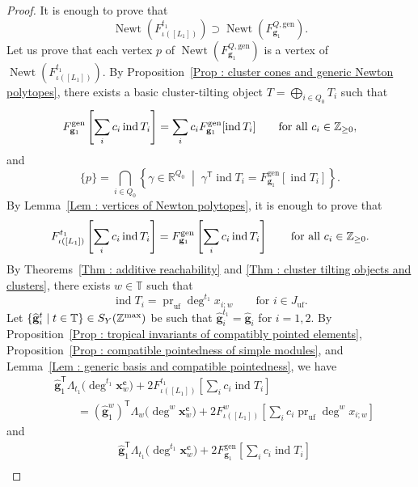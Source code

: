 \begin{proof}
It is enough to prove that
\[
\operatorname{Newt}(F^{t_1}_{\iota([L_1])})
\supset \operatorname{Newt}(F^{Q,\mathrm{gen}}_{\mathbf{g}_1}).
\]
Let us prove that each vertex $p$ of
$\operatorname{Newt}(F^{Q,\mathrm{gen}}_{\mathbf{g}_1})$
is a vertex of $\operatorname{Newt}(F^{t_1}_{\iota([L_1])})$.
By Proposition~\ref{Prop : cluster cones and generic Newton polytopes},
there exists a basic cluster-tilting object
$T = \bigoplus_{i \in Q_0}T_i$ such that
\[
F^{\mathrm{gen}}_{\mathbf{g}_1}
\left[\sum_i c_i\operatorname{ind}T_i\right]
= \sum_i c_i F^{\mathrm{gen}}_{\mathbf{g}_1}
[\operatorname{ind}T_i]
\qquad\text{for all }c_i \in \mathbb{Z}_{\geq 0},
\]
and
\[
\{p\} = \bigcap_{i \in Q_0}
\left\{\gamma \in \mathbb{R}^{Q_0}
\;\middle|\;
\gamma^{\mathsf{T}}\operatorname{ind}T_i
= F^{\mathrm{gen}}_{\mathbf{g}_1}[\operatorname{ind}T_i]
\right\}.
\]
By Lemma~\ref{Lem : vertices of Newton polytopes},
it is enough to prove that
\[
F^{t_1}_{\iota([L_1])}
\left[\sum_i c_i\operatorname{ind}T_i\right]
= F^{\mathrm{gen}}_{\mathbf{g}_1}
\left[\sum_i c_i\operatorname{ind}T_i\right]
\qquad\text{for all }c_i \in \mathbb{Z}_{\geq 0}.
\]
By Theorems~\ref{Thm : additive reachability} and
\ref{Thm : cluster tilting objects and clusters},
there exists $w \in \mathbb{T}$ such that
\[
\operatorname{ind}T_i
= \operatorname{pr}_{\mathrm{uf}}\deg^{t_1}x_{i;w}
\qquad\text{for }i \in J_{\mathrm{uf}}.
\]
Let
$\{\widehat{\mathbf{g}}_i^t \mid t \in \mathbb{T}\}
\in S_Y(\mathbb{Z}^{\max})$
be such that
$\widehat{\mathbf{g}}_i^{t_1} = \widehat{\mathbf{g}}_i$
for $i = 1, 2$.
By Proposition~\ref{Prop : tropical invariants of compatibly pointed elements},
Proposition~\ref{Prop : compatible pointedness of simple modules}, and
Lemma~\ref{Lem : generic basis and compatible pointedness}, we have
\[
\begin{aligned}
&\widehat{\mathbf{g}}_1^{\mathsf{T}}\Lambda_{t_1}
\bigl(\deg^{t_1}\mathbf{x}_{w}^{\mathbf{c}}\bigr)
+ 2F^{t_1}_{\iota([L_1])}
\left[\sum_i c_i\operatorname{ind}T_i\right] \\
&\qquad = (\widehat{\mathbf{g}}_1^{w})^{\mathsf{T}}
\Lambda_{w}
\bigl(\deg^{w}\mathbf{x}_{w}^{\mathbf{c}}\bigr)
+ 2F^{w}_{\iota([L_1])}
\left[\sum_i c_i\operatorname{pr}_{\mathrm{uf}}
\deg^{w}x_{i;w}\right]
\end{aligned}
\]
and
\[
\begin{aligned}
&\widehat{\mathbf{g}}_1^{\mathsf{T}}\Lambda_{t_1}
\bigl(\deg^{t_1}\mathbf{x}_{w}^{\mathbf{c}}\bigr)
+ 2F^{\mathrm{gen}}_{\mathbf{g}_1}
\left[\sum_i c_i\operatorname{ind}T_i\right] \\

\end{aligned}\]
\end{proof}
